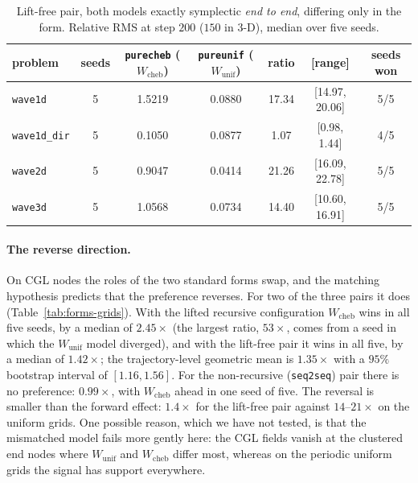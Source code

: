 \documentclass[11pt]{article}
\theoremstyle{definition}
\theoremstyle{remark}
\newcommand{\Wc}{W_{\mathrm{cheb}}}
\newcommand{\Wu}{W_{\mathrm{unif}}}
\begin{document}
\begin{table}[htbp]
\centering
\caption{Lift-free pair, both models exactly symplectic \emph{end to end},
differing only in the form. Relative RMS at step $200$ ($150$ in $3$-D), median
over five seeds.}
\label{tab:pure}
\small
\begin{tabular}{@{}lcccccc@{}}
\toprule
problem & seeds & \texttt{purecheb} ($\Wc$) & \texttt{pureunif} ($\Wu$) & ratio & [range] & seeds won \\
\midrule
\texttt{wave1d} & 5 & 1.5219 & 0.0880 & 17.34 & [14.97, 20.06] & 5/5 \\
\texttt{wave1d\_dir} & 5 & 0.1050 & 0.0877 & 1.07 & [0.98, 1.44] & 4/5 \\
\texttt{wave2d} & 5 & 0.9047 & 0.0414 & 21.26 & [16.09, 22.78] & 5/5 \\
\texttt{wave3d} & 5 & 1.0568 & 0.0734 & 14.40 & [10.60, 16.91] & 5/5 \\
\bottomrule
\end{tabular}
\end{table}

\paragraph{The reverse direction.} On CGL nodes the roles of the two standard
forms swap, and the matching hypothesis predicts that the preference reverses.
For two of the three pairs it does (Table~\ref{tab:forms-grids}). With the lifted
recursive configuration $\Wc$ wins in all five seeds, by a median of $2.45\times$
(the largest ratio, $53\times$, comes from a seed in which the $\Wu$ model
diverged), and with the lift-free pair it wins in all five, by a median of
$1.42\times$; the trajectory-level geometric mean is $1.35\times$ with a $95\%$
bootstrap interval of $[1.16,1.56]$. For the non-recursive (\texttt{seq2seq})
pair there is no preference: $0.99\times$, with $\Wc$ ahead in one seed of five.
The reversal is smaller than the forward effect: $1.4\times$ for the lift-free
pair against $14$--$21\times$ on the uniform grids. One possible reason, which we
have not tested, is that the mismatched model fails more gently here: the CGL
fields vanish at the clustered end nodes where $\Wu$ and $\Wc$ differ most,
whereas on the periodic uniform grids the signal has support everywhere.
\end{document}
